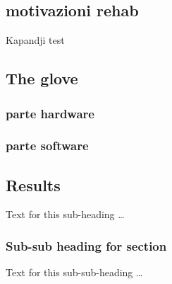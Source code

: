 \documentclass{bmcart}
\begin{document}
\subsection*{motivazioni rehab}
Kapandji test 
\subsection*{The glove}
\subsubsection*{parte hardware}

\subsubsection*{parte software}

\subsection*{Results}
Text for this sub-heading \ldots
\subsubsection*{Sub-sub heading for section}
Text for this sub-sub-heading \ldots

\end{document}
